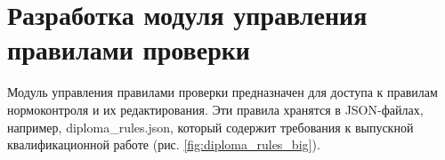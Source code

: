 \documentclass{report}
\begin{document}



\section{Разработка модуля управления правилами проверки}

Модуль управления правилами проверки предназначен для доступа к правилам нормоконтроля и их редактирования. Эти правила хранятся в JSON-файлах, например, diploma\_rules.json, который содержит требования к выпускной квалификационной работе (рис. \ref{fig:diploma_rules_big}). 

\end{document}
